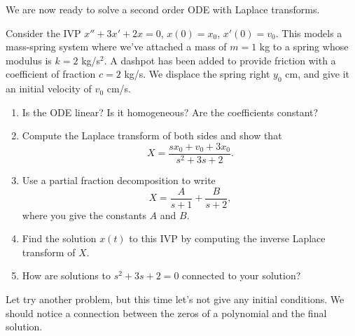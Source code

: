 \mysubsection{\ideaB}



We are now ready to solve a second order ODE with Laplace transforms.
\begin{problem}
 Consider the IVP $x''+3x'+2x=0$, $x(0)=x_0$, $x'(0)=v_0$. This models a mass-spring system where we've attached a mass of $m=1$ kg to a spring whose modulus is $k=2$ kg/s$^2$. A dashpot has been added to provide friction with a coefficient of fraction $c=2$ kg/s.  We displace the spring right $y_0$ cm, and give it an initial velocity of $v_0$ cm/s.   
\begin{enumerate}
 \item Is the ODE linear? Is it homogeneous? Are the coefficients constant?
 \item Compute the Laplace transform of both sides and show that 
$$X = \frac{sx_0+v_0+3x_0}{s^2+3s+2}.$$
 \item 
{}%
Use a partial fraction decomposition to write $$X=\frac{A}{s+1}+\frac{B}{s+2},$$
where you give the constants $A$ and $B$. 
 \item Find the solution $x(t)$ to this IVP by computing the inverse Laplace transform of $X$.
 \item How are solutions to $s^2+3s+2=0$ connected to your solution?  
\end{enumerate}
\end{problem}











Let try another problem, but this time let's not give any initial conditions. We should notice a connection between the zeros of a polynomial and the  final solution.


